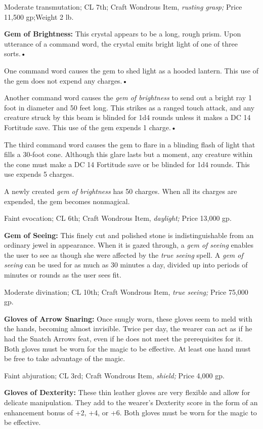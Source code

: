 Moderate transmutation; CL 7th; Craft Wondrous Item, \textit{rusting grasp; }Price 
11,500 gp;Weight 2 lb.

\textbf{Gem of Brightness:} This crystal appears to be a long, rough prism. Upon 
utterance of a command word, the crystal emits bright light of one of three sorts.•

One command word causes the gem to shed light as a hooded lantern. This use of 
the gem does not expend any charges.•

Another command word causes the \textit{gem of brightness }to send out a bright 
ray 1 foot in diameter and 50 feet long. This strikes as a ranged touch attack, 
and any creature struck by this beam is blinded for 1d4 rounds unless it makes 
a DC 14 Fortitude save. This use of the gem expends 1 charge.•

The third command word causes the gem to flare in a blinding flash of light that 
fills a 30-foot cone. Although this glare lasts but a moment, any creature within 
the cone must make a DC 14 Fortitude save or be blinded for 1d4 rounds. This use 
expends 5 charges.

A newly created \textit{gem of brightness }has 50 charges. When all its charges 
are expended, the gem becomes nonmagical.

Faint evocation; CL 6th; Craft Wondrous Item, \textit{daylight; }Price 13,000 gp.

\textbf{Gem of Seeing: }This finely cut and polished stone is indistinguishable 
from an ordinary jewel in appearance. When it is gazed through, a \textit{gem of 
seeing }enables the user to see as though she were affected by the \textit{true 
seeing }spell. A \textit{gem of seeing }can be used for as much as 30 minutes a 
day, divided up into periods of minutes or rounds as the user sees fit.

Moderate divination; CL 10th; Craft Wondrous Item, \textit{true seeing; }Price 
75,000 gp.

\textbf{Gloves of Arrow Snaring: }Once snugly worn, these gloves seem to meld with 
the hands, becoming almost invisible. Twice per day, the wearer can act as if he 
had the Snatch Arrows feat, even if he does not meet the prerequisites for it. 
Both gloves must be worn for the magic to be effective. At least one hand must 
be free to take advantage of the magic.

Faint abjuration; CL 3rd; Craft Wondrous Item, \textit{shield; }Price 4,000 gp.

\textbf{Gloves of Dexterity:} These thin leather gloves are very flexible and allow 
for delicate manipulation. They add to the wearer's Dexterity score in the form 
of an enhancement bonus of +2, +4, or +6. Both gloves must be worn for the magic 
to be effective.

